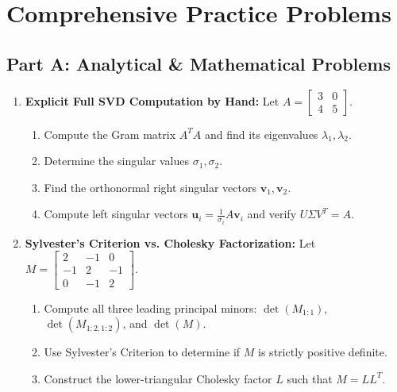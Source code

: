 \section{Comprehensive Practice Problems}

\subsection*{Part A: Analytical \& Mathematical Problems}

\begin{enumerate}[label=\textbf{P\arabic*.}]
    \item \textbf{Explicit Full SVD Computation by Hand:}
    Let $A = \begin{bmatrix} 3 & 0 \\ 4 & 5 \end{bmatrix}$.
    \begin{enumerate}[label=(\alph*)]
        \item Compute the Gram matrix $A^T A$ and find its eigenvalues $\lambda_1, \lambda_2$.
        \item Determine the singular values $\sigma_1, \sigma_2$.
        \item Find the orthonormal right singular vectors $\mathbf{v}_1, \mathbf{v}_2$.
        \item Compute left singular vectors $\mathbf{u}_i = \frac{1}{\sigma_i} A \mathbf{v}_i$ and verify $U \Sigma V^T = A$.
    \end{enumerate}

    \item \textbf{Sylvester's Criterion vs. Cholesky Factorization:}
    Let $M = \begin{bmatrix} 2 & -1 & 0 \\ -1 & 2 & -1 \\ 0 & -1 & 2 \end{bmatrix}$.
    \begin{enumerate}[label=(\alph*)]
        \item Compute all three leading principal minors: $\det(M_{1:1})$, $\det(M_{1:2, 1:2})$, and $\det(M)$.
        \item Use Sylvester's Criterion to determine if $M$ is strictly positive definite.
        \item Construct the lower-triangular Cholesky factor $L$ such that $M = L L^T$.
    \end{enumerate}


\end{enumerate}
